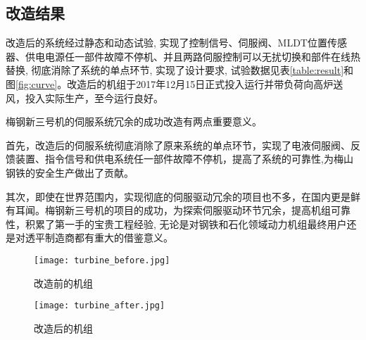 \documentclass[UTF8,a1paper,twoside,11pt]{article}
\begin{document}
{\begin{multicols}{2}
\section*{改造结果}
改造后的系统经过静态和动态试验, 实现了控制信号、伺服阀、MLDT位置传感器、供电电源任一部件故障不停机、并且两路伺服控制可以无扰切换和部件在线热替换, 彻底消除了系统的单点环节, 实现了设计要求, 试验数据见表\ref{table:result}和图\ref{fig:curve}。改造后的机组于2017年12月15日正式投入运行并带负荷向高炉送风，投入实际生产，至今运行良好。\par 
梅钢新三号机的伺服系统冗余的成功改造有两点重要意义。\par
首先，改造后的伺服系统彻底消除了原来系统的单点环节，实现了电液伺服阀、反馈装置、指令信号和供电系统任一部件故障不停机，提高了系统的可靠性,为梅山钢铁的安全生产做出了贡献。\par
其次，即使在世界范围内，实现彻底的伺服驱动冗余的项目也不多，在国内更是鲜有耳闻。梅钢新三号机的项目的成功，为探索伺服驱动环节冗余，提高机组可靠性，积累了第一手的宝贵工程经验, 无论是对钢铁和石化领域动力机组最终用户还是对透平制造商都有重大的借鉴意义。\par
\end{multicols}
\begin{center}
\noindent
\begin{minipage}[c]{0.48\textwidth}
\begin{figure}[H]
\begin{center}
\texttt{[image: turbine\_before.jpg]}
\caption{改造前的机组}
\label{fig:turbine_before}
\end{center}
\end{figure}
\end{minipage}
\hfill
\begin{minipage}[c]{0.48\textwidth}
\begin{figure}[H]
\begin{center}
\texttt{[image: turbine\_after.jpg]}
\caption{改造后的机组}
\label{fig:turbine_after}
\end{center}
\end{figure}
\end{minipage}
\end{center}		


}
\end{document}
